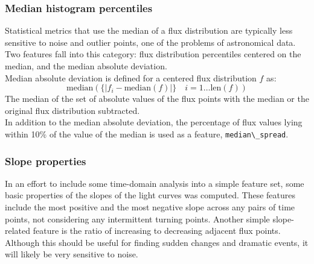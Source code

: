 \documentclass[10pt]{report}
\begin{document}
	
	\subsubsection{Median histogram percentiles}
	Statistical metrics that use the median of a flux distribution are typically less sensitive to noise and outlier points, one of the problems of astronomical data. Two features fall into this category: flux distribution percentiles centered on the median, and the median absolute deviation.  \\

	Median absolute deviation is defined for a centered flux distribution $f$ as:
	\begin{equation}
		\mbox{median}(\{|f_{i} - \mbox{median}(f)|\} \quad i=1\ldots\mbox{len}(f))
	\end{equation}
	The median of the set of absolute values of the flux points with the median or the original flux distribution subtracted. \\
	
	In addition to the median absolute deviation, the percentage of flux values lying within 10\% of the value of the median is used as a feature, \verb#median\_spread#.
	
	\subsubsection{Slope properties}
	In an effort to include some time-domain analysis into a simple feature set, some basic properties of the slopes of the light curves was computed. These features include the most positive and the most negative slope across any pairs of time points, not considering any intermittent turning points. Another simple slope-related feature is the ratio of increasing to decreasing adjacent flux points. Although this should be useful for finding sudden changes and dramatic events, it will likely be very sensitive to noise.
	
\end{document}
